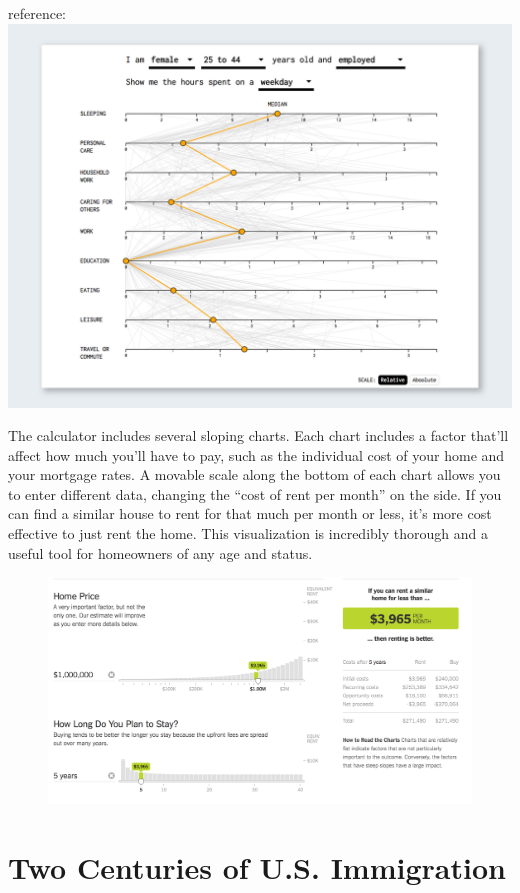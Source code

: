 \documentclass[]{book}
\theoremstyle{definition}
\theoremstyle{definition}
\theoremstyle{definition}
\theoremstyle{remark}
\begin{document}
reference: \citep{rent_or_buy} \includegraphics{images/SpendingTime.png}

The calculator includes several sloping charts. Each chart includes a
factor that'll affect how much you'll have to pay, such as the
individual cost of your home and your mortgage rates. A movable scale
along the bottom of each chart allows you to enter different data,
changing the ``cost of rent per month'' on the side. If you can find a
similar house to rent for that much per month or less, it's more cost
effective to just rent the home. This visualization is incredibly
thorough and a useful tool for homeowners of any age and status.

\begin{figure}
\centering
\includegraphics{images/rentcalc.png}
\caption{}
\end{figure}

\section{Two Centuries of U.S.
Immigration}\label{two-centuries-of-u.s.-immigration}
\end{document}
